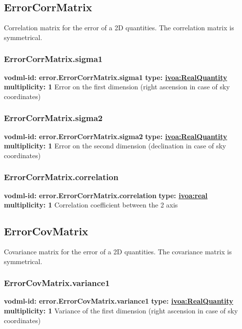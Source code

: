   \subsection{ErrorCorrMatrix}
  \label{sect:error.ErrorCorrMatrix}
    Correlation matrix for the error of a 2D quantities. The correlation matrix is symmetrical.

    \subsubsection{ErrorCorrMatrix.sigma1}
      \textbf{vodml-id: error.ErrorCorrMatrix.sigma1} \newline
      \textbf{type: \hyperref[sect:ivoa]{ivoa:RealQuantity}} \newline
      \textbf{multiplicity: 1} \newline
      Error on the first dimension (right ascension in case of sky coordinates)

    \subsubsection{ErrorCorrMatrix.sigma2}
      \textbf{vodml-id: error.ErrorCorrMatrix.sigma2} \newline
      \textbf{type: \hyperref[sect:ivoa]{ivoa:RealQuantity}} \newline
      \textbf{multiplicity: 1} \newline
      Error on the second dimension (declination in case of sky coordinates)

    \subsubsection{ErrorCorrMatrix.correlation}
      \textbf{vodml-id: error.ErrorCorrMatrix.correlation} \newline
      \textbf{type: \hyperref[sect:ivoa]{ivoa:real}} \newline
      \textbf{multiplicity: 1} \newline
      Correlation coefficient between the 2 axis

  \subsection{ErrorCovMatrix}
  \label{sect:error.ErrorCovMatrix}
    Covariance matrix for the error of a 2D quantities. The covariance matrix is symmetrical.

    \subsubsection{ErrorCovMatrix.variance1}
      \textbf{vodml-id: error.ErrorCovMatrix.variance1} \newline
      \textbf{type: \hyperref[sect:ivoa]{ivoa:RealQuantity}} \newline
      \textbf{multiplicity: 1} \newline
      Variance of the first dimension (right ascension in case of sky coordinates)

